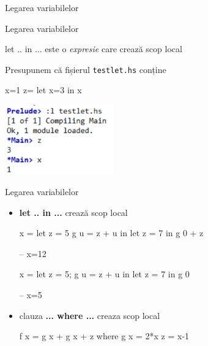 \documentclass[xcolor=pdftex,romanian,colorlinks]{beamer}
\begin{document}
\begin{section}{Legarea variabilelor}
\begin{frame}[fragile]{Legarea variabilelor}
\begin{block}{let .. in ...}
este o {\it expresie} care crează scop local
\end{block}
Presupunem că fișierul \verb"testlet.hs" conține
\begin{asciihs}
x=1
z= let x=3 in x
\end{asciihs}
\includegraphics[height=3cm]{testlet.png}

\end{frame}

\begin{frame}[fragile]{Legarea variabilelor}
\begin{itemize}
\item {\bf let .. in ...}  crează scop local

\begin{minipage}{.4\columnwidth}
\begin{asciihs}
x = let
        z = 5
        g u = z + u
    in  let
            z = 7
        in g 0 + z
\end{asciihs}
\pause
\end{minipage}
\begin{minipage}{.4\columnwidth}
  \begin{asciihs}
   -- x=12
  \end{asciihs}
\end{minipage}
  \pause
\begin{minipage}{.8\columnwidth}
  \begin{asciihs}
x = let z = 5; g u = z + u in let z = 7 in g 0
\end{asciihs}
\end{minipage}
\pause
\begin{minipage}{.1\columnwidth}
  \begin{asciihs}
-- x=5
\end{asciihs}
\end{minipage}
\pause

\item clauza {\bf ... where ...} creaza scop local
\begin{asciihs}
f x = g x + g x + z
  where
    g x = 2*x
    z =  x-1


\end{asciihs}
\end{itemize}
\end{frame}
\end{section}
\end{document}
